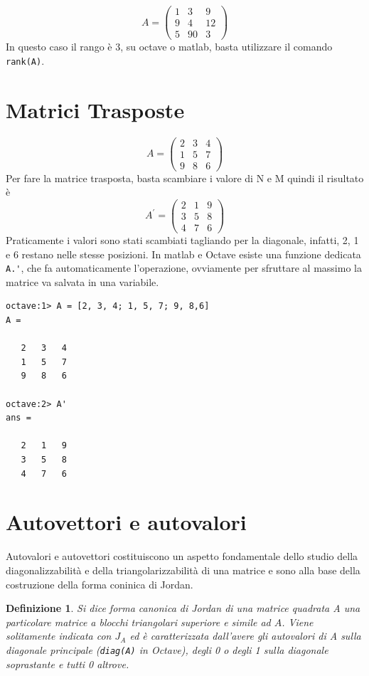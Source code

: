 \documentclass{book}
\newtheorem{defi}{Definizione}[section]
\begin{document}
\begin{equation*}
  A=\begin{pmatrix}
      1 & 3 & 9\\
      9 & 4 & 12\\
      5 & 90 & 3
  \end{pmatrix}
\end{equation*}
In questo caso il rango è 3, su octave o matlab, basta utilizzare il comando
\lstinline|rank(A)|.\\

\section{Matrici Trasposte}
\label{sec:matt}
\begin{equation*}
  A = \begin{pmatrix}
    2 & 3 & 4\\
    1 & 5 & 7\\
    9 & 8 & 6        
  \end{pmatrix}
\end{equation*}
Per fare la matrice trasposta, basta scambiare i valore di N e M quindi il risultato è
\begin{equation*}
  A^\prime=
  \begin{pmatrix}
    2  & 1 &  9\\
    3  & 5 &  8\\
    4  & 7 &  6
  \end{pmatrix}
\end{equation*}
Praticamente i valori sono stati scambiati tagliando per la diagonale,
infatti, 2, 1 e 6 restano nelle stesse posizioni. In matlab e Octave esiste una
funzione dedicata \lstinline|A.'|, che fa automaticamente l'operazione,
ovviamente per sfruttare al massimo la matrice va salvata in una variabile.
\begin{verbatim}
octave:1> A = [2, 3, 4; 1, 5, 7; 9, 8,6]
A =

   2   3   4
   1   5   7
   9   8   6

octave:2> A'
ans =

   2   1   9
   3   5   8
   4   7   6
\end{verbatim}

\section{Autovettori e autovalori}
\label{sec:autovettorieautovalori}

Autovalori e autovettori costituiscono un aspetto fondamentale dello studio della
diagonalizzabilità e della triangolarizzabilità di una matrice e sono alla base
della costruzione della forma coninica di Jordan.
\begin{defi}
  Si dice forma canonica di Jordan di una matrice quadrata A una particolare matrice a
  blocchi triangolari superiore e simile ad $A$. Viene solitamente indicata con $J_A$ ed
  è caratterizzata dall'avere gli autovalori di A sulla diagonale principale
  (\lstinline|diag(A)| in Octave), degli 0 o degli 1 sulla diagonale soprastante e tutti
  0 altrove. 
\end{defi}
\end{document}
